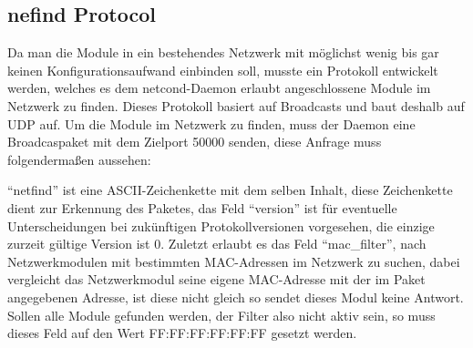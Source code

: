 \documentclass[a4paper,14pt,headsepline]{scrartcl}
\begin{document}
\subsection{nefind Protocol}
Da man die Module in ein bestehendes Netzwerk mit möglichst wenig bis gar keinen Konfigurationsaufwand einbinden soll, musste ein Protokoll entwickelt werden, welches es dem netcond-Daemon erlaubt angeschlossene Module im Netzwerk zu finden. Dieses Protokoll basiert auf Broadcasts und baut deshalb auf UDP auf. Um die Module im Netzwerk zu finden, muss der Daemon eine Broadcaspaket mit dem Zielport 50000 senden, diese Anfrage muss folgendermaßen aussehen:
\begin{figure}[h]
\begin{center}
\end{center}
\end{figure}

"`netfind"' ist eine ASCII-Zeichenkette mit dem selben Inhalt, diese Zeichenkette dient zur Erkennung des Paketes, das Feld "`version"' ist für eventuelle Unterscheidungen bei zukünftigen Protokollversionen vorgesehen, die einzige zurzeit gültige Version ist 0. Zuletzt erlaubt es das Feld "`mac\_filter"', nach Netzwerkmodulen mit bestimmten MAC-Adressen im Netzwerk zu suchen, dabei vergleicht das Netzwerkmodul seine eigene MAC-Adresse mit der im Paket angegebenen Adresse, ist diese nicht gleich so sendet dieses Modul keine Antwort. Sollen alle Module gefunden werden, der Filter also nicht aktiv sein, so muss dieses Feld auf den Wert FF:FF:FF:FF:FF:FF gesetzt werden.

\newpage
\end{document}
